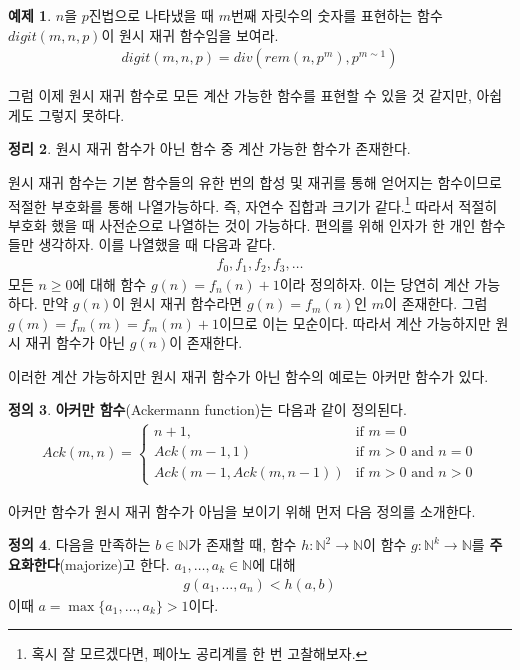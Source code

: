 \documentclass[b5paper, 11pt]{book}
\theoremstyle{definition}
\newtheorem{defn}{정의}[chapter]
\newtheorem{thm}[defn]{정리}
\newtheorem{ex}[defn]{예제}
\newenvironment{pf*}{\pushQED{\qed}\pf}
{\popQED\endpf}
\begin{document}
\begin{ex}
    $n$을 $p$진법으로 나타냈을 때 $m$번째 자릿수의 숫자를 표현하는 함수 $digit(m,n,p)$이 원시 재귀 함수임을 보여라.
    \begin{align*}
        digit(m,n,p) = div(rem(n,p^m), p^{m \sim 1})
    \end{align*}
\end{ex}
그럼 이제 원시 재귀 함수로 모든 계산 가능한 함수를 표현할 수 있을 것 같지만, 아쉽게도 그렇지 못하다.
\begin{thm}
    원시 재귀 함수가 아닌 함수 중 계산 가능한 함수가 존재한다.
\end{thm} 
\begin{pf*}
원시 재귀 함수는 기본 함수들의 유한 번의 합성 및 재귀를 통해 얻어지는 함수이므로 적절한 부호화를 통해 나열가능하다. 즉, 자연수 집합과 크기가 같다.\footnote{혹시 잘 모르겠다면, 페아노 공리계를 한 번 고찰해보자.} 따라서 적절히 부호화 했을 때 사전순으로 나열하는 것이 가능하다. 편의를 위해 인자가 한 개인 함수들만 생각하자. 이를 나열했을 때 다음과 같다.
\begin{align*}
    f_0, f_1, f_2, f_3, \ldots 
\end{align*}
모든 $n \ge 0$에 대해 함수 $g(n) = f_n (n) +  1$이라 정의하자. 이는 당연히 계산 가능하다. 만약 $g(n)$이 원시 재귀 함수라면 $g(n) = f_m(n)$인 $m$이 존재한다. 그럼 $g(m) = f_m(m) = f_m(m) + 1$이므로 이는 모순이다. 따라서 계산 가능하지만 원시 재귀 함수가 아닌 $g(n)$이 존재한다. 
\end{pf*}
이러한 계산 가능하지만 원시 재귀 함수가 아닌 함수의 예로는 아커만 함수가 있다.
\begin{defn}
    \textbf{아커만 함수}(Ackermann function)는 다음과 같이 정의된다. 
    \begin{align*}
        Ack(m,n) = \begin{cases}
            n+1, & \text{if } m = 0 \\ 
            Ack(m-1, 1) & \text{if } m > 0 \text{ and } n = 0 \\ 
            Ack(m-1, Ack(m, n-1)) & \text{if } m>0 \text{ and } n > 0 
        \end{cases} 
    \end{align*}
\end{defn}
아커만 함수가 원시 재귀 함수가 아님을 보이기 위해 먼저 다음 정의를 소개한다.
\begin{defn}
    다음을 만족하는 $b\in \mathbb{N}$가 존재할 때, 함수 $h:\mathbb{N}^2 \rightarrow \mathbb{N}$이 함수 $g:\mathbb{N}^k\rightarrow \mathbb{N}$를 \textbf{주요화한다}(majorize)고 한다. $a_1, \ldots, a_k \in \mathbb{N}$에 대해
    \begin{align*}
        g(a_1, \ldots, a_n) < h(a, b)
    \end{align*}
    이때 $a = \max{\{a_1, \ldots, a_k\}} > 1$이다. 
\end{defn} 
\end{document}
